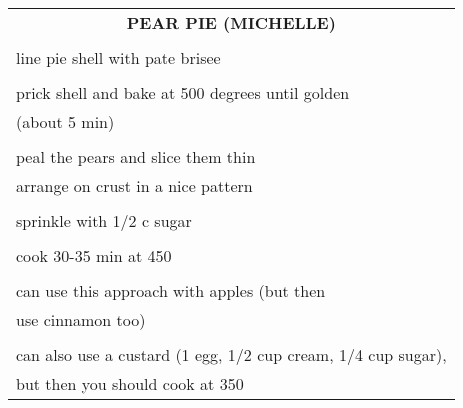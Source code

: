 \documentclass[8pt]{report}
\begin{document}
\begin{tabular}{|l|} \hline	%
 
\multicolumn{1}{|c|}{\textbf{PEAR PIE (MICHELLE)}}
\\
\\

\index{desserts!pear pie (michelle)} \index{pear pie} \index{pie!pear}

line pie shell with pate brisee\\
\\
prick shell and bake at 500 degrees until golden\\
(about 5 min)\\
\\
peal the pears and slice them thin\\
arrange on crust in a nice pattern\\
\\
sprinkle with 1/2 c sugar\\
\\
cook 30-35 min at 450\\
\\
can use this approach with apples (but then\\
use cinnamon too)\\
\\
can also use a custard (1 egg, 1/2 cup cream, 1/4 cup sugar),\\
but then you should cook at 350\\


\hline

\end{tabular}

\newpage

\centering
\end{document}
